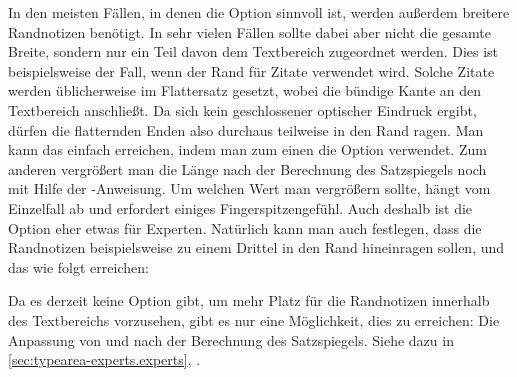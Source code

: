 \begin{Explain}
  In den meisten Fällen, in denen die Option  sinnvoll ist,
  werden außerdem breitere Randnotizen benötigt. In sehr vielen Fällen sollte
  dabei aber nicht die gesamte Breite, sondern nur ein Teil davon dem
  Textbereich zugeordnet werden. Dies ist beispielsweise der Fall, wenn der
  Rand für Zitate verwendet wird. Solche Zitate werden üblicherweise im
  Flattersatz gesetzt, wobei die bündige Kante an den Textbereich
  anschließt. Da sich kein geschlossener optischer Eindruck ergibt, dürfen die
  flatternden Enden also durchaus teilweise in den Rand ragen. Man kann das
  einfach erreichen, indem man zum einen die Option 
  verwendet. Zum anderen vergrößert man die Länge  nach
  der Berechnung des Satzspiegels noch mit Hilfe der
  -Anweisung. Um welchen Wert man vergrößern sollte, hängt
  vom Einzelfall ab und erfordert einiges Fingerspitzengefühl. Auch deshalb
  ist die Option  eher etwas für Experten. Natürlich kann
  man auch festlegen, dass die Randnotizen beispielsweise zu einem Drittel in
  den Rand hineinragen sollen, und das wie folgt erreichen:
\begin{lstcode}
  \setlength{\marginparwidth}{1.5\marginparwidth}
\end{lstcode}

  Da es derzeit keine Option gibt, um mehr Platz für die Randnotizen innerhalb
  des Textbereichs vorzusehen, gibt es nur eine Möglichkeit, dies zu
  erreichen: %
\iftrue %
  Die Anpassung von  und
   nach der Berechnung des
  Satzspiegels. Siehe dazu
   in
  \autoref{sec:typearea-experts.experts},
  .
%
\else
%
  Man verzichtet auf die Option \Option{mpinclude} oder setzt
  \Option{mpinclude} auf \PValue{false}, verringert nach der
  Satzspiegelberechnung die Breite des Textbereichs \Macro{textwidth} und
  setzt die Breite des Bereichs der Randnotizen auf den Wert, um den man die
  Breite des Textbereichs verringert hat. Leider lässt sich dieses Vorgehen
  nicht mit der automatischen Berechnung des \PName{DIV}-Wertes verbinden.
  Demgegenüber wird \Option{mpinclude} bei
  \OptionValueRef{\LabelBase}{DIV}{calc}\IndexOption{DIV=calc} (siehe
  \DescPageRef{typearea.option.DIV.calc}) berücksichtigt.
%
\fi
\end{Explain}

